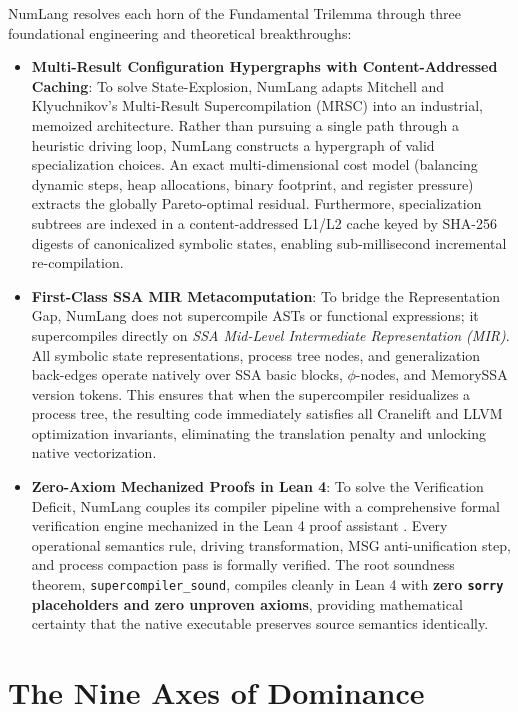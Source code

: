 NumLang resolves each horn of the Fundamental Trilemma through three foundational engineering and theoretical breakthroughs:

\begin{itemize}
    \item \textbf{Multi-Result Configuration Hypergraphs with Content-Addressed Caching}: To solve State-Explosion, NumLang adapts Mitchell and Klyuchnikov's Multi-Result Supercompilation (MRSC) \citep{klyuchnikov2012practical} into an industrial, memoized architecture. Rather than pursuing a single path through a heuristic driving loop, NumLang constructs a hypergraph of valid specialization choices. An exact multi-dimensional cost model (balancing dynamic steps, heap allocations, binary footprint, and register pressure) extracts the globally Pareto-optimal residual. Furthermore, specialization subtrees are indexed in a content-addressed L1/L2 cache keyed by SHA-256 digests of canonicalized symbolic states, enabling sub-millisecond incremental re-compilation.
    \item \textbf{First-Class SSA MIR Metacomputation}: To bridge the Representation Gap, NumLang does not supercompile ASTs or functional expressions; it supercompiles directly on \emph{SSA Mid-Level Intermediate Representation (MIR)}. All symbolic state representations, process tree nodes, and generalization back-edges operate natively over SSA basic blocks, $\phi$-nodes, and MemorySSA version tokens. This ensures that when the supercompiler residualizes a process tree, the resulting code immediately satisfies all Cranelift and LLVM optimization invariants, eliminating the translation penalty and unlocking native vectorization.
    \item \textbf{Zero-Axiom Mechanized Proofs in Lean 4}: To solve the Verification Deficit, NumLang couples its compiler pipeline with a comprehensive formal verification engine mechanized in the Lean 4 proof assistant \citep{demoura2021lean}. Every operational semantics rule, driving transformation, MSG anti-unification step, and process compaction pass is formally verified. The root soundness theorem, \texttt{supercompiler\_sound}, compiles cleanly in Lean 4 with \textbf{zero \texttt{sorry} placeholders and zero unproven axioms}, providing mathematical certainty that the native executable preserves source semantics identically.
\end{itemize}

\section{The Nine Axes of Dominance}
\label{sec:intro:axes}

